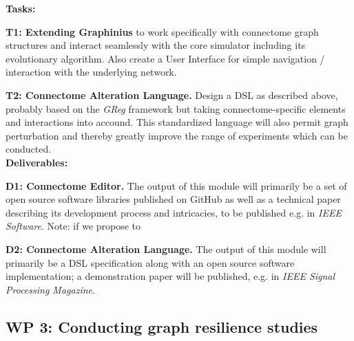 \documentclass[a4paper,11pt]{article}
\begin{document}


\textbf{Tasks:}

\textbf{T1: Extending Graphinius} to work specifically with connectome graph structures and interact seamlessly with the core simulator including its evolutionary algorithm. Also create a User Interface for simple navigation / interaction with the underlying network.

\textbf{T2: Connectome Alteration Language.} Design a DSL as described above, probably based on the \emph{GReg} framework but taking connectome-specific elements and interactions into accound. This standardized language will also permit graph perturbation and thereby greatly improve the range of experiments which can be conducted.
\\[0,2cm]


\textbf{Deliverables:}

\textbf{D1: Connectome Editor.} The output of this module will primarily be a set of open source software libraries published on GitHub as well as a technical paper describing its development process and intricacies, to be published e.g. in \textit{IEEE Software}.
Note: if we propose to 

\textbf{D2: Connectome Alteration Language.} The output of this module will primarily be a DSL specification along with an open source software implementation; a demonstration paper will be published, e.g. in \textit{IEEE Signal Processing Magazine}.



\subsection{WP 3: Conducting graph resilience studies}
\end{document}

